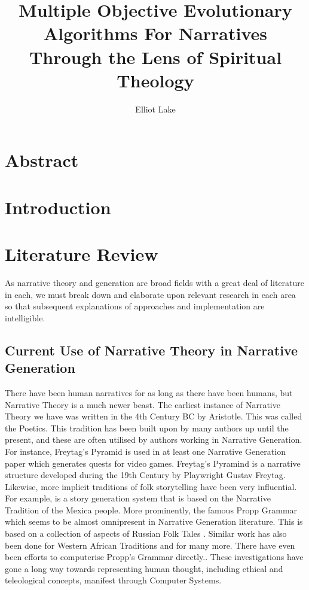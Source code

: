 \documentclass[11pt]{article}
\author{Elliot Lake}
\title{Multiple Objective Evolutionary Algorithms For Narratives Through the Lens of Spiritual Theology}
\begin{document}
\maketitle

\section{Abstract}

\section{Introduction}

\section{Literature Review}
As narrative theory and generation are broad fields with a great deal of literature in each, we must break down and elaborate upon relevant research in each area so that subsequent explanations of approaches and implementation are intelligible.

\subsection{Current Use of Narrative Theory in Narrative Generation}
There have been human narratives for as long as there have been humans, but Narrative Theory is a much newer beast. The earliest instance of Narrative Theory we have was written in the 4th Century BC by Aristotle. This was called the Poetics. This tradition has been built upon by many authors up until the present, and these are often utilised by authors working in Narrative Generation.  For instance, Freytag's Pyramid is used in at least one Narrative Generation paper which generates quests for video games\cite{questgeneration}.  Freytag's Pyramind is a narrative structure developed during the 19th Century by Playwright Gustav Freytag. Likewise, more implicit traditions of folk storytelling have been very influential. For example, \cite{MEXICA} is a story generation system that is based on the Narrative Tradition of the Mexica people. More prominently, the famous Propp Grammar which seems to be almost omnipresent in Narrative Generation literature. This is based on a collection of aspects of Russian Folk Tales \cite{propp1975morphology}. Similar work has also been done for Western African Traditions \cite{WestAfricanGeneration} and for many more.  There have even been efforts to computerise Propp's Grammar directly.\cite{Gervs2013ProppsMO}. These investigations have gone a long way towards representing human thought, including ethical and teleological concepts, manifest through Computer Systems. \\
\end{document}
